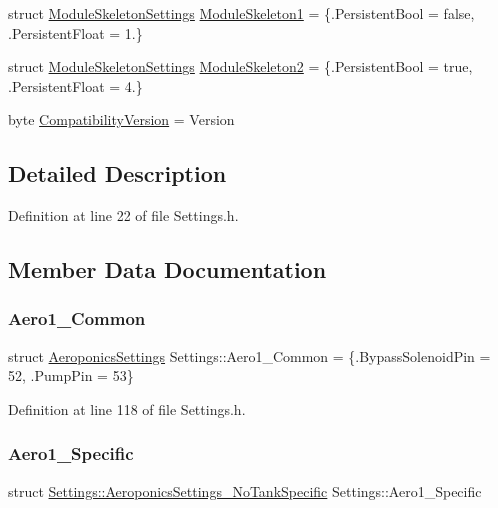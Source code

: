 \begin{DoxyCompactItemize}
\item 
struct \hyperlink{struct_settings_1_1_module_skeleton_settings}{Module\+Skeleton\+Settings} \hyperlink{struct_settings_a74935720d208940141e63f288208c648}{Module\+Skeleton1} = \{.Persistent\+Bool = false, .Persistent\+Float = 1.\}
\item 
struct \hyperlink{struct_settings_1_1_module_skeleton_settings}{Module\+Skeleton\+Settings} \hyperlink{struct_settings_a36f14dc8de6e5472163be758a77121e3}{Module\+Skeleton2} = \{.Persistent\+Bool = true, .Persistent\+Float = 4.\}
\item 
byte \hyperlink{struct_settings_ae5627689dde65d3312155975a4b2fcb4}{Compatibility\+Version} = Version
\end{DoxyCompactItemize}


\subsection{Detailed Description}


Definition at line 22 of file Settings.\+h.



\subsection{Member Data Documentation}
\mbox{\label{struct_settings_ad27589745cefc2482110c14d378e6581}} 
\subsubsection{\texorpdfstring{Aero1\+\_\+\+Common}{Aero1\_Common}}
{\footnotesize\ttfamily struct \hyperlink{struct_settings_1_1_aeroponics_settings}{Aeroponics\+Settings} Settings\+::\+Aero1\+\_\+\+Common = \{.Bypass\+Solenoid\+Pin = 52, .Pump\+Pin = 53\}}



Definition at line 118 of file Settings.\+h.

\mbox{\label{struct_settings_a28c68e733956792c889a66905f09480c}} 
\subsubsection{\texorpdfstring{Aero1\+\_\+\+Specific}{Aero1\_Specific}}
{\footnotesize\ttfamily struct \hyperlink{struct_settings_1_1_aeroponics_settings___no_tank_specific}{Settings\+::\+Aeroponics\+Settings\+\_\+\+No\+Tank\+Specific} Settings\+::\+Aero1\+\_\+\+Specific}

